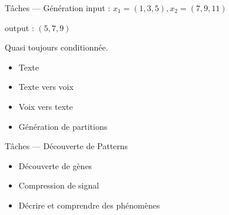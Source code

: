 \begin{frame}{Tâches --- Génération}
  input : $x_1=(1,3,5),x_2=(7,9,11)$

  output : $(5,7,9)$

  Quasi toujours conditionnée.

  \begin{itemize}
    \item Texte
    \item Texte vers voix
    \item Voix vers texte
    \item Génération de partitions
  \end{itemize}
\end{frame}

\begin{frame}{Tâches --- Découverte de Patterns}
  \begin{itemize}
    \item Découverte de gènes
    \item Compression de signal
    \item Décrire et comprendre des phénomènes
  \end{itemize}
\end{frame}
